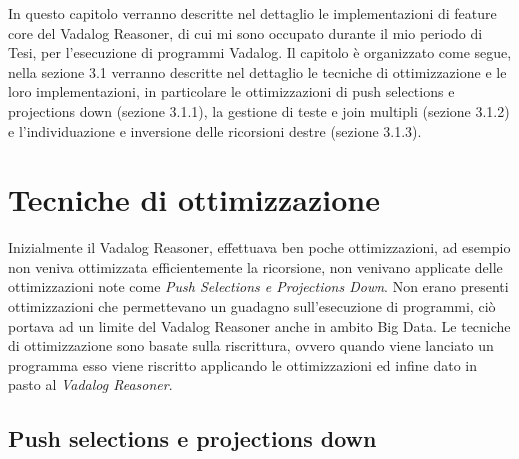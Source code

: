 In questo capitolo verranno descritte nel dettaglio le implementazioni di feature core del Vadalog Reasoner, di cui mi sono occupato durante il mio periodo di Tesi, per l'esecuzione di programmi Vadalog. \newline
Il capitolo è organizzato come segue, nella sezione 3.1 verranno descritte nel dettaglio le tecniche di ottimizzazione e le loro implementazioni, in particolare le ottimizzazioni di push selections e projections down (sezione 3.1.1), la gestione di teste e join multipli (sezione 3.1.2) e l'individuazione e inversione delle ricorsioni destre (sezione 3.1.3). \newline

\section{Tecniche di ottimizzazione}

Inizialmente il Vadalog Reasoner, effettuava ben poche ottimizzazioni, ad esempio non veniva ottimizzata efficientemente la ricorsione, non venivano applicate delle ottimizzazioni note come \emph{Push Selections e Projections Down}. Non erano presenti ottimizzazioni che permettevano un guadagno sull'esecuzione di programmi, ciò portava ad un limite del Vadalog Reasoner anche in ambito Big Data. \newline
Le tecniche di ottimizzazione sono basate sulla riscrittura, ovvero quando viene lanciato un programma esso viene riscritto applicando le ottimizzazioni ed infine dato in pasto al \emph{Vadalog Reasoner}.

\subsection{Push selections e projections down}

